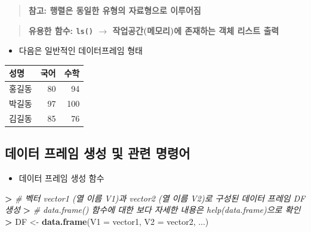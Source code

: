 \documentclass[11pt,a4paper]{book}
\newenvironment{Shaded}{\begin{snugshade}}{\end{snugshade}}
\newcommand{\KeywordTok}[1]{\textcolor[rgb]{0.13,0.29,0.53}{\textbf{#1}}}
\newcommand{\DataTypeTok}[1]{\textcolor[rgb]{0.13,0.29,0.53}{#1}}
\newcommand{\StringTok}[1]{\textcolor[rgb]{0.31,0.60,0.02}{#1}}
\newcommand{\CommentTok}[1]{\textcolor[rgb]{0.56,0.35,0.01}{\textit{#1}}}
\newcommand{\OperatorTok}[1]{\textcolor[rgb]{0.81,0.36,0.00}{\textbf{#1}}}
\newcommand{\ErrorTok}[1]{\textcolor[rgb]{0.64,0.00,0.00}{\textbf{#1}}}
\newcommand{\NormalTok}[1]{#1}
\providecommand{\tightlist}{%
  \setlength{\itemsep}{0pt}\setlength{\parskip}{0pt}}
\theoremstyle{definition}
\theoremstyle{definition}
\theoremstyle{definition}
\theoremstyle{remark}
\begin{document}
\begin{quote}
\textbf{참고: 행렬은 동일한 유형의 자료형으로 이루어짐}
\end{quote}

\begin{quote}
\textbf{유용한 함수: \texttt{ls()} \(\rightarrow\) 작업공간(메모리)에
존재하는 객체 리스트 출력}
\end{quote}

\begin{itemize}
\tightlist
\item
  다음은 일반적인 데이터프레임 형태
\end{itemize}

\footnotesize

\begin{tabular}{l|r|r}
\hline
성명 & 국어 & 수학\\
\hline
홍길동 & 80 & 94\\
\hline
박길동 & 97 & 100\\
\hline
김길동 & 85 & 76\\
\hline
\end{tabular}

\normalsize

\subsection{데이터 프레임 생성 및 관련 명령어}\label{-----}

\begin{itemize}
\tightlist
\item
  데이터 프레임 생성 함수
\end{itemize}

\footnotesize

\begin{Shaded}
\begin{Highlighting}[]
\OperatorTok{>}\StringTok{ }\CommentTok{# 벡터 vector1 (열 이름 V1)과 vector2 (열 이름 V2)로 구성된 데이터 프레임 DF 생성}
\ErrorTok{>}\StringTok{ }\CommentTok{# data.frame() 함수에 대한 보다 자세한 내용은 help(data.frame)으로 확인}
\ErrorTok{>}\StringTok{ }\NormalTok{DF <-}\StringTok{ }\KeywordTok{data.frame}\NormalTok{(}\DataTypeTok{V1 =}\NormalTok{ vector1, }\DataTypeTok{V2 =}\NormalTok{ vector2, ...)}
\end{Highlighting}
\end{Shaded}

\normalsize
\end{document}
